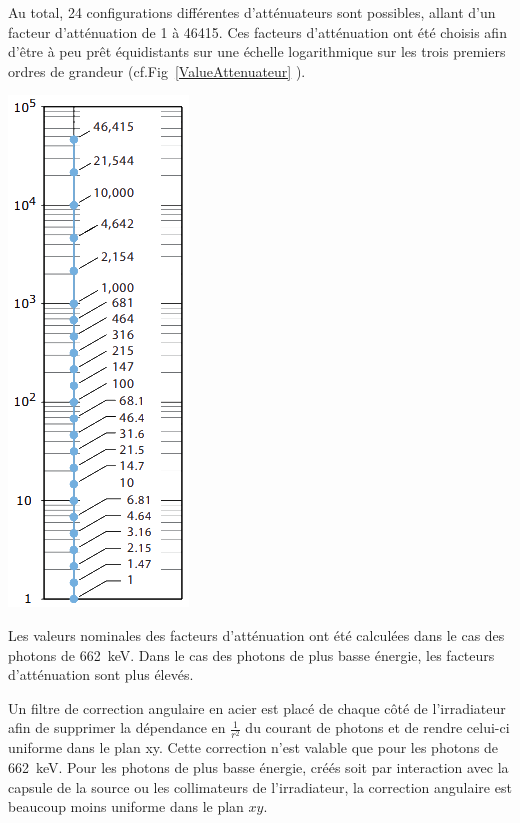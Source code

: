 Au total, 24 configurations différentes d'atténuateurs sont possibles, allant d'un facteur d'atténuation de 1 à 46415. Ces facteurs d'atténuation ont été choisis afin d'être à peu prêt équidistants sur une échelle logarithmique sur les trois premiers ordres de grandeur (cf.Fig~\ref{ValueAttenuateur} \cite{Pfeiffer:2016hnl}).

\marginpar
{
	\centering
	\includegraphics[width=1.0\marginparwidth]{GLA/ValueAttenuateur.png}
	\label{ValueAttenuateur}
}

Les valeurs nominales des facteurs d'atténuation ont été calculées dans le cas des photons de \SI{662}{\kilo\eV}. Dans le cas des photons de plus basse énergie, les facteurs d'atténuation sont plus élevés. 

Un filtre de correction angulaire en acier est placé de chaque côté de l'irradiateur afin de supprimer la dépendance en $\frac{1}{r^2}$ du courant de photons et de rendre celui-ci uniforme dans le plan xy. Cette correction n'est valable que pour les photons de \SI{662}{\kilo\eV}. Pour les photons de plus basse énergie, créés soit par interaction avec la capsule de la source ou les collimateurs de l'irradiateur, la correction angulaire est beaucoup moins uniforme dans le plan $xy$.

